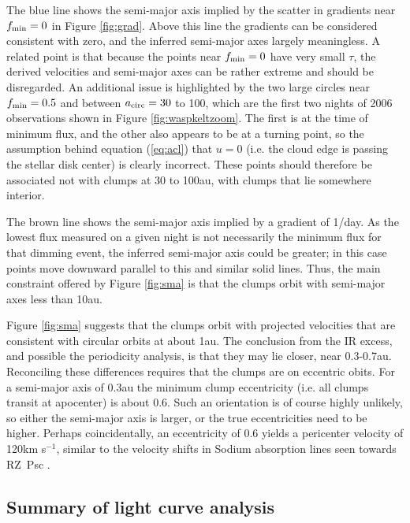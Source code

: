 \documentclass[useAMS,usenatbib,usegraphicx]{mn2e}
\begin{document}
The blue line shows the semi-major axis implied by the scatter in gradients near
$f_{\rm min}=0$ in Figure \ref{fig:grad}. Above this line the gradients can be considered
consistent with zero, and the inferred semi-major axes largely meaningless. A related
point is that because the points near $f_{\rm min}=0$ have very small $\tau$, the derived
velocities and semi-major axes can be rather extreme and should be disregarded. An
additional issue is highlighted by the two large circles near $f_{\rm min}=0.5$ and
between $a_{\rm circ}=30$ to 100, which are the first two nights of 2006 observations
shown in Figure \ref{fig:waspkeltzoom}. The first is at the time of minimum flux, and the
other also appears to be at a turning point, so the assumption behind equation
(\ref{eq:acl}) that $u=0$ (i.e. the cloud edge is passing the stellar disk center) is
clearly incorrect. These points should therefore be associated not with clumps at 30 to
100au, with clumps that lie somewhere interior.

The brown line shows the semi-major axis implied by a gradient of 1/day. As the lowest
flux measured on a given night is not necessarily the minimum flux for that dimming
event, the inferred semi-major axis could be greater; in this case points move downward
parallel to this and similar solid lines. Thus, the main constraint offered by Figure
\ref{fig:sma} is that the clumps orbit with semi-major axes less than 10au.

Figure \ref{fig:sma} suggests that the clumps orbit with projected velocities that are
consistent with circular orbits at about 1au. The conclusion from the IR excess, and
possible the periodicity analysis, is that they may lie closer, near
0.3-0.7au. Reconciling these differences requires that the clumps are on eccentric
obits. For a semi-major axis of 0.3au the minimum clump eccentricity (i.e. all clumps
transit at apocenter) is about 0.6. Such an orientation is of course highly unlikely, so
either the semi-major axis is larger, or the true eccentricities need to be
higher. Perhaps coincidentally, an eccentricity of 0.6 yields a pericenter velocity of
120km s$^{-1}$, similar to the velocity shifts in Sodium absorption lines seen towards
RZ~Psc \citep[][noting however that the pericenter velocity is tangential, and the
absorption lines show projected radial velocity]{2013Ap.....56..453P}.

\subsection{Summary of light curve analysis}\label{ss:wheresum}
\end{document}
